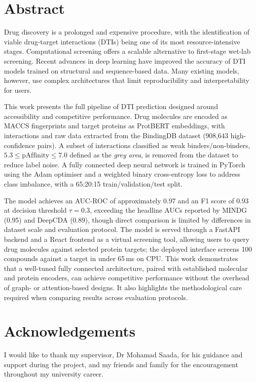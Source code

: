 \section*{Abstract}
Drug discovery is a prolonged and expensive procedure, with the identification of viable drug-target interactions (DTIs) being one of its most resource-intensive stages.
Computational screening offers a scalable alternative to first-stage wet-lab screening.
Recent advances in deep learning have improved the accuracy of DTI models trained on structural and sequence-based data.
Many existing models, however, use complex architectures that limit reproducibility and interpretability for users.

This work presents the full pipeline of DTI prediction designed around accessibility and competitive performance.
Drug molecules are encoded as MACCS fingerprints and target proteins as ProtBERT embeddings, with interactions and raw data extracted from the BindingDB dataset (908{,}643 high-confidence pairs).
A subset of interactions classified as weak binders/non-binders, $5.3 \leq \mathrm{pAffinity} \leq 7.0$ defined as the \textit{grey area}, is removed from the dataset to reduce label noise.
A fully connected deep neural network is trained in PyTorch using the Adam optimiser and a weighted binary cross-entropy loss to address class imbalance, with a 65:20:15 train/validation/test split.

The model achieves an AUC-ROC of approximately 0.97 and an F1 score of 0.93 at decision threshold $\tau = 0.3$, exceeding the headline AUCs reported by MINDG (0.95) and DeepCDA (0.89), though direct comparison is limited by differences in dataset scale and evaluation protocol.
The model is served through a FastAPI backend and a React frontend as a virtual screening tool, allowing users to query drug molecules against selected protein targets; the deployed interface screens 100 compounds against a target in under 65\,ms on CPU.
This work demonstrates that a well-tuned fully connected architecture, paired with established molecular and protein encoders, can achieve competitive performance without the overhead of graph- or attention-based designs.
It also highlights the methodological care required when comparing results across evaluation protocols.
\section*{Acknowledgements}
I would like to thank my supervisor, Dr Mohamad Saada, for his guidance and support during the project, and my friends and family for the encouragement throughout my university career.